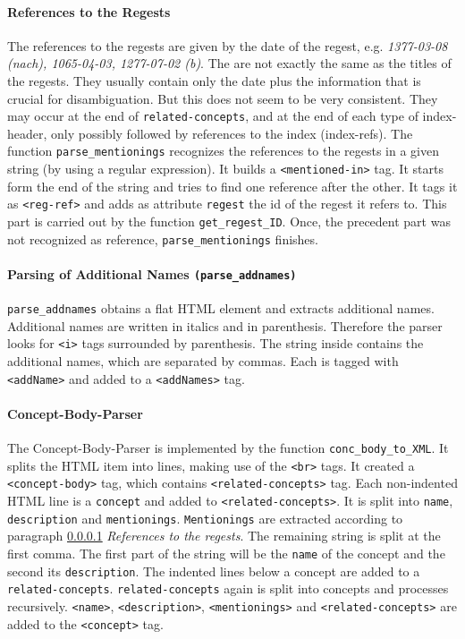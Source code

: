 \paragraph{References to the Regests}
\label{sec:reg-refs}
The references to the regests are given by the date of the regest, e.g. \textit{1377-03-08 (nach), 1065-04-03, 1277-07-02 (b)}. The are not exactly the same as the titles of the regests. They usually contain only the date plus the information that is crucial for disambiguation. But this does not seem to be very consistent. They may occur at the end of \texttt{related-concepts}, and at the end of each type of index-header, only possibly followed by references to the index (index-refs).
The function \texttt{parse\_mentionings} recognizes the references to the regests in a given string (by using a regular expression). It builds a \texttt{<mentioned-in>} tag. It starts form the end of the string and tries to find one reference after the other. It tags it as \texttt{<reg-ref>} and adds as attribute \texttt{regest} the id of the regest it refers to. This part is carried out by the function \texttt{get\_regest\_ID}. Once, the precedent part was not recognized as reference, \texttt{parse\_mentionings} finishes.


\paragraph{Parsing of Additional Names \texttt{(parse\_addnames)}}
\label{sec:addNames}
\texttt{parse\_addnames} obtains a flat HTML element and extracts additional names. Additional names are written in italics and in parenthesis. Therefore the parser looks for \texttt{<i>} tags surrounded by parenthesis. The string inside contains the additional names, which are separated by commas. Each is tagged with \texttt{<addName>} and added to a \texttt{<addNames>} tag.

\paragraph{Concept-Body-Parser}
\label{sec:conc-body-parser}
The Concept-Body-Parser is implemented by the function \texttt{conc\_body\_to\_XML}. It splits the HTML item into lines, making use of the \texttt{<br>} tags. It created a \texttt{<concept-body>} tag, which contains \texttt{<related-concepts>} tag. Each non-indented HTML line is a \texttt{concept} and added to \texttt{<related-concepts>}. It is split into \texttt{name}, \texttt{description} and \texttt{mentionings}. \texttt{Mentionings} are extracted according to paragraph \ref{sec:reg-refs} \textit{References to the regests}. The remaining string is split at the first comma. The first part of the string will be the \texttt{name} of the concept and the second its \texttt{description}. The indented lines below a concept are added to a \texttt{related-concepts}. \texttt{related-concepts} again is split into concepts and processes recursively. \texttt{<name>}, \texttt{<description>}, \texttt{<mentionings>} and \texttt{<related-concepts>} are added to the \texttt{<concept>} tag.

